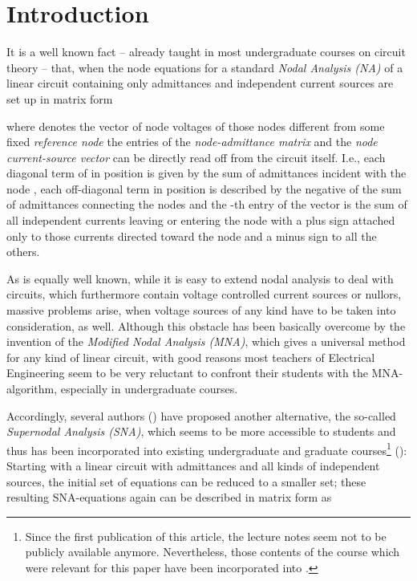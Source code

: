 \documentclass[10pt,journal,twocolumn,pagenumbers]{IEEEtran}
\begin{document}
\section{Introduction}
\noindent 
It is a well known fact -- already taught in most undergraduate courses on circuit theory \cite{Balabanian} -- that,
when the node equations for a standard {\sl Nodal Analysis (NA)} of a linear circuit containing only admittances and independent current sources are set up in matrix form

where  denotes the vector of node voltages  of those nodes different from some fixed {\em reference node}  
the entries of the {\em node-admittance matrix}  and the {\em node current-source vector}  can be directly read off from the circuit itself. I.e., each diagonal term of   in position  is given by the sum of admittances incident with the node , each off-diagonal term in position   is described by the negative of the sum of admittances connecting the nodes  and  the -th entry of the vector  is the sum of all independent currents leaving or entering the node  with a plus sign attached only to those currents directed toward the node and a minus sign to all the others.

As is equally well known, while it is easy to extend nodal analysis to deal with circuits, which furthermore contain voltage controlled current sources or nullors, massive problems arise, when voltage sources of any kind have to be taken into consideration, as well. Although this obstacle has been basically overcome by the invention of the {\sl Modified Nodal Analysis (MNA)}, which gives a universal method for any kind of linear circuit, with good reasons most teachers of Electrical Engineering seem to be very reluctant to confront their students with the MNA-algorithm, especially in undergraduate courses.   

Accordingly, several authors (\cite{SommerSuper,ChenDavis}) have proposed another alternative, the so-called {\sl Supernodal Ana\-ly\-sis (SNA)}, which seems to be more accessible to students and thus has been incorporated into existing undergraduate and graduate courses\footnote{Since the first publication of this article, the lecture notes \cite{SommerVL} seem not to be publicly available anymore. Nevertheless, those contents of the course which were relevant for this paper have been incorporated into \cite{SommerGST}.} (\cite{Davis,SommerVL,GerbrachtVL}):
Starting with a linear circuit with admittances and all kinds of independent sources, the initial set of equations can be reduced to a smaller set; these resulting SNA-equations again can be described in matrix form as
\end{document}
